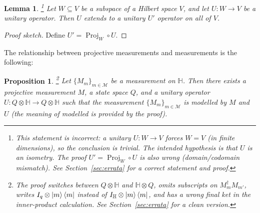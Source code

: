 \documentclass[12pt]{article}
\theoremstyle{plain}
\newtheorem{proposition}[thm]{Proposition}
\newtheorem{lemma}[thm]{Lemma}
\theoremstyle{definition}
\newcommand{\bb}[1]{\mathbb{#1}}
\newcommand{\call}[1]{\mathcal{#1}}
\newcommand{\lto}{\longrightarrow}
\begin{document}
\begin{lemma}\footnote{This statement is incorrect: a unitary $U:W\to V$ forces $W=V$ (in finite dimensions), so the conclusion is trivial. The intended hypothesis is that $U$ is an \emph{isometry}. The proof $U'=\operatorname{Proj}_W\circ U$ is also wrong (domain/codomain mismatch). See Section~\ref{sec:errata} for a correct statement and proof.}
Let $W \subseteq V$ be a subspace of a Hilbert space $V$, and let $U: W \lto V$ be a unitary operator. Then $U$ extends to a unitary $U'$ operator on all of $V$.
\end{lemma}
\begin{proof}[Proof sketch]
Define $U' = \operatorname{Proj}_W \circ U$.
\end{proof}
The relationship between projective measurements and measurements is the following:
\begin{proposition}\footnote{The proof switches between $Q\otimes\mathbb{H}$ and $\mathbb{H}\otimes Q$, omits subscripts on $M_m^\dagger M_{m'}$, writes $I_q\otimes\ket{m}\bra{m}$ instead of $I_\mathbb{H}\otimes\ket{m}\bra{m}$, and has a wrong final ket in the inner-product calculation. See Section~\ref{sec:errata} for a clean version.}
Let $\lbrace M_m\rbrace_{m \in \call{M}}$ be a measurement on $\bb{H}$. Then there exists a projective measurement $M$, a state space $Q$, and a unitary operator $U: Q \otimes \bb{H} \lto Q \otimes \bb{H}$ such that the measurement $\lbrace M_m\rbrace_{m \in \call{M}}$ is modelled by $M$ and $U$ (the meaning of \emph{modelled} is provided by the proof).
\end{proposition}
\end{document}
